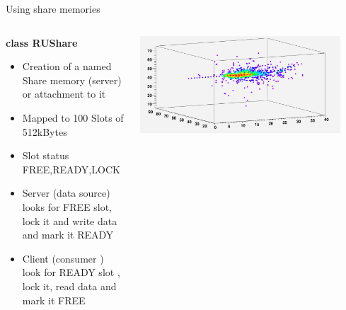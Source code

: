 \documentclass[10pt]{beamer}
\begin{document}
\begin{frame}{Using share memories}


\begin{columns}
 \begin{column}{0.5\textwidth}
 {\bf class RUShare } 
 \begin{itemize}
 \item <1-> Creation of a named Share memory (server) or attachment to it
 \item <1-> Mapped to 100 Slots of 512kBytes
 \item <1-> Slot status FREE,READY,LOCK
 \item <2->Server (data source) looks for FREE slot, lock it and write data and mark it READY
 \item <2->Client (consumer ) look for READY slot , lock it, read data and mark it FREE
 \end{itemize}
\end{column}
 \begin{column}{0.65\textwidth}
{
    \centerline{\includegraphics[width=0.9\textwidth]{images/ShowerExample}}
}
\end{column}
\end{columns}
\end{frame}
\end{document}
